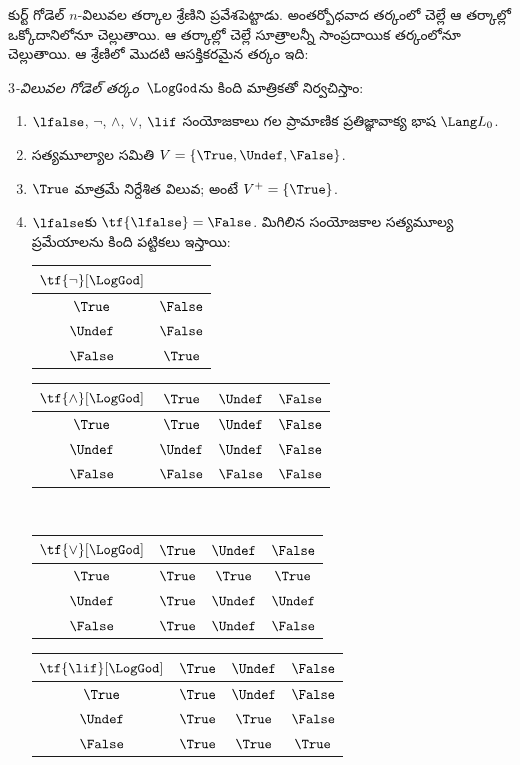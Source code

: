 \documentclass[../../../include/open-logic-section]{subfiles}
\begin{document}


కుర్ట్ గోడెల్ $n$-విలువల తర్కాల శ్రేణిని
ప్రవేశపెట్టాడు. అంతర్బోధవాద తర్కంలో చెల్లే
 ఆ తర్కాల్లో ఒక్కోదానిలోనూ
చెల్లుతాయి. ఆ తర్కాల్లో చెల్లే సూత్రాలన్నీ సాంప్రదాయిక
తర్కంలోనూ చెల్లుతాయి. ఆ శ్రేణిలో మొదటి ఆసక్తికరమైన తర్కం ఇది:

\begin{defn}
\emph{$3$-విలువల గోడెల్ తర్కం}~$\LogGod$ను
కింది మాత్రికతో నిర్వచిస్తాం:
\begin{enumerate}
  \item $\lfalse$, $\lnot$, $\land$, $\lor$, $\lif$
  సంయోజకాలు గల ప్రామాణిక ప్రతిజ్ఞావాక్య భాష
  $\Lang L_0$.
  \item సత్యమూల్యాల సమితి $V = \{\True, \Undef, \False\}$.
  \item $\True$ మాత్రమే నిర్దేశిత విలువ; అంటే
  $V^+ = \{\True\}$.
  \item $\lfalse$కు $\tf{\lfalse} = \False$.
  మిగిలిన సంయోజకాల సత్యమూల్య ప్రమేయాలను
  కింది పట్టికలు ఇస్తాయి:
  \begin{center}
    \begin{tabular}{c|c}
      $\tf{\lnot}[\LogGod]$ & \\
      \hline
      $\True$ & $\False$ \\
      $\Undef$ & $\False$ \\
      $\False$ & $\True$
    \end{tabular}
    \quad
    \begin{tabular}{c|ccc}
      $\tf{\land}[\LogGod]$ & $\True$ & $\Undef$ & $\False$ \\
      \hline
      $\True$ & $\True$ & $\Undef$ & $\False$ \\
      $\Undef$ & $\Undef$ & $\Undef$ & $\False$\\
      $\False$ & $\False$ & $\False$ & $\False$
    \end{tabular}
    \\[2ex]
    \begin{tabular}{c|ccc}
      $\tf{\lor}[\LogGod]$ & $\True$ & $\Undef$ & $\False$ \\
      \hline
      $\True$ & $\True$ & $\True$ & $\True$ \\
      $\Undef$ & $\True$ & $\Undef$ & $\Undef$ \\
      $\False$ & $\True$ & $\Undef$ & $\False$
    \end{tabular}
    \quad
    \begin{tabular}{c|ccc}
      $\tf{\lif}[\LogGod]$ & $\True$ & $\Undef$ & $\False$ \\
      \hline
      $\True$ & $\True$ & $\Undef$ & $\False$ \\
      $\Undef$ & $\True$ & $\True$ & $\False$  \\
      $\False$ & $\True$ & $\True$ & $\True$
    \end{tabular}
  \end{center}
\end{enumerate}
\end{defn}
\end{document}
